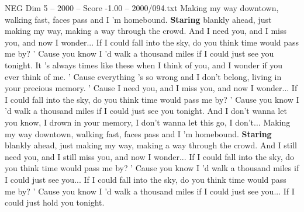 \begin{textsample}{NEG Dim 5 – 2000 – Score -1.00 – 2000/094.txt}  \label{ex:f5_neg_032}
Making my way downtown, walking fast, faces pass and I 'm homebound. \textbf{Staring} blankly ahead, just making my way, making a way through the crowd.
And I need you, and I miss you, and now I wonder...
If I could fall into the sky, do you think time would pass me by? ' Cause you know I 'd walk a thousand miles if I could just see you tonight.
It 's always times like these when I think of you, and I wonder if you ever think of me. ' Cause everything 's so wrong and I don't belong, living in your precious memory. ' Cause I need you, and I miss you, and now I wonder...
If I could fall into the sky, do you think time would pass me by? ' Cause you know I 'd walk a thousand miles if I could just see you tonight.
And I don't wanna let you know, I drown in your memory, I don't wanna let this go, I don't...
Making my way downtown, walking fast, faces pass and I 'm homebound. \textbf{Staring} blankly ahead, just making my way, making a way through the crowd.
And I still need you, and I still miss you, and now I wonder...
If I could fall into the sky, do you think time would pass me by? ' Cause you know I 'd walk a thousand miles if I could just see you...
If I could fall into the sky, do you think time would pass me by? ' Cause you know I 'd walk a thousand miles if I could just see you...
If I could just hold you tonight.

\end{textsample}
